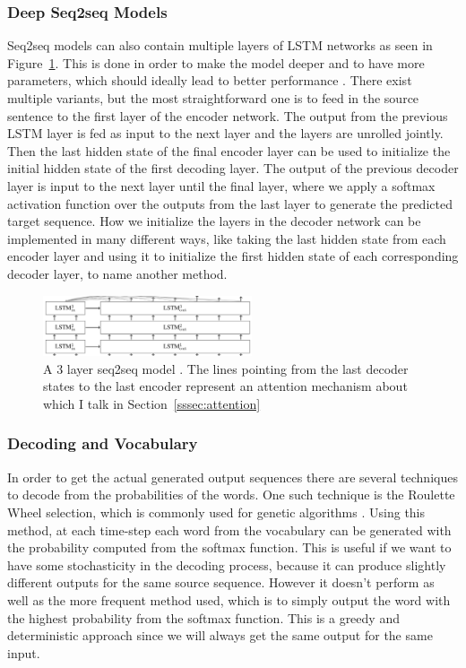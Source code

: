 \documentclass[12pt]{article}
\begin{document}
\subsubsection{Deep Seq2seq Models}
Seq2seq models can also contain multiple layers of LSTM networks as seen in Figure~\ref{fig:232b}. This is done in order to make the model deeper and to have more parameters, which should ideally lead to better performance \cite{Vinyals:2015,googleNMT:2016}. There exist multiple variants, but the most straightforward one is to feed in the source sentence to the first layer of the encoder network. The output from the previous LSTM layer is fed as input to the next layer and the layers are unrolled jointly. Then the last hidden state of the final encoder layer can be used to initialize the initial hidden state of the first decoding layer. The output of the previous decoder layer is input to the next layer until the final layer, where we apply a softmax activation function over the outputs from the last layer to generate the predicted target sequence. How we initialize the layers in the decoder network can be implemented in many different ways, like taking the last hidden state from each encoder layer and using it to initialize the first hidden state of each corresponding decoder layer, to name another method.

\begin{figure}[H]
	\label{fig:232b}
	\centering
	\includegraphics[width=0.55\textwidth]{pics/deep_seq2seq.png}
	\caption{A 3 layer seq2seq model \cite{deep_seq2seq}. The lines pointing from the last decoder states to the last encoder represent an attention mechanism about which I talk in Section~\ref{sssec:attention}}
\end{figure}

\subsubsection{Decoding and Vocabulary} \label{sssec:234}
In order to get the actual generated output sequences there are several techniques to decode from the probabilities of the words. One such technique is the Roulette Wheel selection, which is commonly used for genetic algorithms \cite{GA:1998}. Using this method, at each time-step each word from the vocabulary can be generated with the probability computed from the softmax function. This is useful if we want to have some stochasticity in the decoding process, because it can produce slightly different outputs for the same source sequence. However it doesn't perform as well as the more frequent method used, which is to simply output the word with the highest probability from the softmax function. This is a greedy and deterministic approach since we will always get the same output for the same input.
\end{document}

